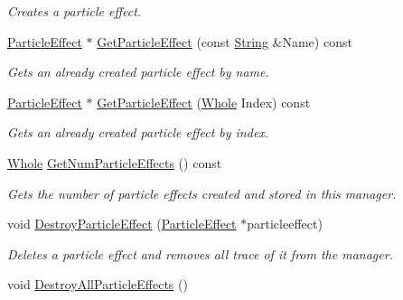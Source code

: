 \begin{DoxyCompactItemize}
\begin{DoxyCompactList}\small\item\em Creates a particle effect. \item\end{DoxyCompactList}\item 
\hyperlink{classphys_1_1ParticleEffect}{ParticleEffect} $\ast$ \hyperlink{classphys_1_1SceneManager_af1f8d6b77b1088dea72685719ff6936f}{GetParticleEffect} (const \hyperlink{namespacephys_aa03900411993de7fbfec4789bc1d392e}{String} \&Name) const 
\begin{DoxyCompactList}\small\item\em Gets an already created particle effect by name. \item\end{DoxyCompactList}\item 
\hyperlink{classphys_1_1ParticleEffect}{ParticleEffect} $\ast$ \hyperlink{classphys_1_1SceneManager_acfe014153bbda04b181959774536aec5}{GetParticleEffect} (\hyperlink{namespacephys_a460f6bc24c8dd347b05e0366ae34f34a}{Whole} Index) const 
\begin{DoxyCompactList}\small\item\em Gets an already created particle effect by index. \item\end{DoxyCompactList}\item 
\hyperlink{namespacephys_a460f6bc24c8dd347b05e0366ae34f34a}{Whole} \hyperlink{classphys_1_1SceneManager_aad3e20c92eef52372671450704a2ac51}{GetNumParticleEffects} () const 
\begin{DoxyCompactList}\small\item\em Gets the number of particle effects created and stored in this manager. \item\end{DoxyCompactList}\item 
void \hyperlink{classphys_1_1SceneManager_addce8f82a6758db345568dbd4a88f5b9}{DestroyParticleEffect} (\hyperlink{classphys_1_1ParticleEffect}{ParticleEffect} $\ast$particleeffect)
\begin{DoxyCompactList}\small\item\em Deletes a particle effect and removes all trace of it from the manager. \item\end{DoxyCompactList}\item 
\hypertarget{classphys_1_1SceneManager_ac70441dd536d4b9be2c2143148b75420}{
void \hyperlink{classphys_1_1SceneManager_ac70441dd536d4b9be2c2143148b75420}{DestroyAllParticleEffects} ()}
\label{classphys_1_1SceneManager_ac70441dd536d4b9be2c2143148b75420}


\end{DoxyCompactItemize}
